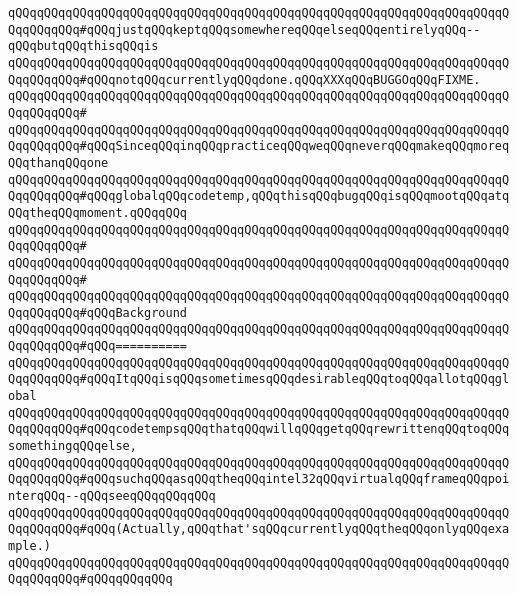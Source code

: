 \verb|qQQqqQQqqQQqqQQqqQQqqQQqqQQqqQQqqQQqqQQqqQQqqQQqqQQqqQQqqQQqqQQqqQQqqQQqqQQqqQQq#qQQqjustqQQqkeptqQQqsomewhereqQQqelseqQQqentirelyqQQq--qQQqbutqQQqthisqQQqis|\newline
\verb|qQQqqQQqqQQqqQQqqQQqqQQqqQQqqQQqqQQqqQQqqQQqqQQqqQQqqQQqqQQqqQQqqQQqqQQqqQQqqQQq#qQQqnotqQQqcurrentlyqQQqdone.qQQqXXXqQQqBUGGOqQQqFIXME.|\newline
\verb|qQQqqQQqqQQqqQQqqQQqqQQqqQQqqQQqqQQqqQQqqQQqqQQqqQQqqQQqqQQqqQQqqQQqqQQqqQQqqQQq#|\newline
\verb|qQQqqQQqqQQqqQQqqQQqqQQqqQQqqQQqqQQqqQQqqQQqqQQqqQQqqQQqqQQqqQQqqQQqqQQqqQQqqQQq#qQQqSinceqQQqinqQQqpracticeqQQqweqQQqneverqQQqmakeqQQqmoreqQQqthanqQQqone|\newline
\verb|qQQqqQQqqQQqqQQqqQQqqQQqqQQqqQQqqQQqqQQqqQQqqQQqqQQqqQQqqQQqqQQqqQQqqQQqqQQqqQQq#qQQqglobalqQQqcodetemp,qQQqthisqQQqbugqQQqisqQQqmootqQQqatqQQqtheqQQqmoment.qQQqqQQq|\newline
\verb|qQQqqQQqqQQqqQQqqQQqqQQqqQQqqQQqqQQqqQQqqQQqqQQqqQQqqQQqqQQqqQQqqQQqqQQqqQQqqQQq#|\newline
\verb|qQQqqQQqqQQqqQQqqQQqqQQqqQQqqQQqqQQqqQQqqQQqqQQqqQQqqQQqqQQqqQQqqQQqqQQqqQQqqQQq#|\newline
\verb|qQQqqQQqqQQqqQQqqQQqqQQqqQQqqQQqqQQqqQQqqQQqqQQqqQQqqQQqqQQqqQQqqQQqqQQqqQQqqQQq#qQQqBackground|\newline
\verb|qQQqqQQqqQQqqQQqqQQqqQQqqQQqqQQqqQQqqQQqqQQqqQQqqQQqqQQqqQQqqQQqqQQqqQQqqQQqqQQq#qQQq==========|\newline
\verb|qQQqqQQqqQQqqQQqqQQqqQQqqQQqqQQqqQQqqQQqqQQqqQQqqQQqqQQqqQQqqQQqqQQqqQQqqQQqqQQq#qQQqItqQQqisqQQqsometimesqQQqdesirableqQQqtoqQQqallotqQQqglobal|\newline
\verb|qQQqqQQqqQQqqQQqqQQqqQQqqQQqqQQqqQQqqQQqqQQqqQQqqQQqqQQqqQQqqQQqqQQqqQQqqQQqqQQq#qQQqcodetempsqQQqthatqQQqwillqQQqgetqQQqrewrittenqQQqtoqQQqsomethingqQQqelse,|\newline
\verb|qQQqqQQqqQQqqQQqqQQqqQQqqQQqqQQqqQQqqQQqqQQqqQQqqQQqqQQqqQQqqQQqqQQqqQQqqQQqqQQq#qQQqsuchqQQqasqQQqtheqQQqintel32qQQqvirtualqQQqframeqQQqpointerqQQq--qQQqseeqQQqqQQqqQQq|\newline
\verb|qQQqqQQqqQQqqQQqqQQqqQQqqQQqqQQqqQQqqQQqqQQqqQQqqQQqqQQqqQQqqQQqqQQqqQQqqQQqqQQq#qQQq(Actually,qQQqthat'sqQQqcurrentlyqQQqtheqQQqonlyqQQqexample.)|\newline
\verb|qQQqqQQqqQQqqQQqqQQqqQQqqQQqqQQqqQQqqQQqqQQqqQQqqQQqqQQqqQQqqQQqqQQqqQQqqQQqqQQq#qQQqqQQqqQQq|\newline
